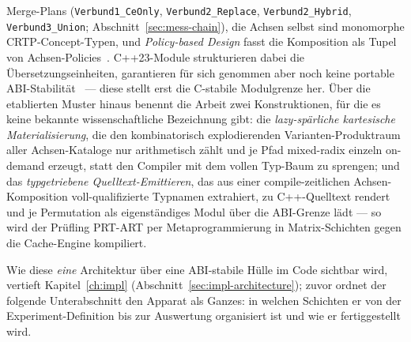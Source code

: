 \begin{nurlang}
Merge-Plans (\texttt{Verbund1\_CeOnly}, \texttt{Verbund2\_Replace}, \texttt{Verbund2\_Hybrid},
\texttt{Verbund3\_Union}; Abschnitt~\ref{sec:mess-chain}), die Achsen selbst sind monomorphe
CRTP-Concept-Typen, und \emph{Policy-based Design} fasst die Komposition als Tupel von
Achsen-Policies~\cite{alexandrescu2001modern}. C++23-Module strukturieren dabei die
Übersetzungseinheiten, garantieren für sich genommen aber noch keine portable
ABI-Stabilität~\cite{wg21_modules_abi} --- diese stellt erst die C-stabile Modulgrenze her. Über die etablierten Muster hinaus benennt die Arbeit zwei
Konstruktionen, für die es keine bekannte wissenschaftliche Bezeichnung gibt: die \emph{lazy-spärliche
kartesische Materialisierung}, die den kombinatorisch explodierenden Varianten-Produktraum aller
Achsen-Kataloge nur
arithmetisch zählt und je Pfad mixed-radix einzeln on-demand erzeugt, statt den Compiler mit dem vollen
Typ-Baum zu sprengen; und das \emph{typgetriebene Quelltext-Emittieren}, das aus einer compile-zeitlichen
Achsen-Komposition voll-qualifizierte Typnamen extrahiert, zu C++-Quelltext rendert und je Permutation als
eigenständiges Modul über die ABI-Grenze lädt --- so wird der Prüfling PRT-ART per Metaprogrammierung in
Matrix-Schichten gegen die Cache-Engine kompiliert.

Wie diese \emph{eine} Architektur über eine ABI-stabile Hülle im Code sichtbar wird, vertieft
Kapitel~\ref{ch:impl} (Abschnitt~\ref{sec:impl-architecture}); zuvor ordnet der folgende Unterabschnitt den
Apparat als Ganzes: in welchen Schichten er von der Experiment-Definition bis zur Auswertung organisiert
ist und wie er fertiggestellt wird.
\end{nurlang}
